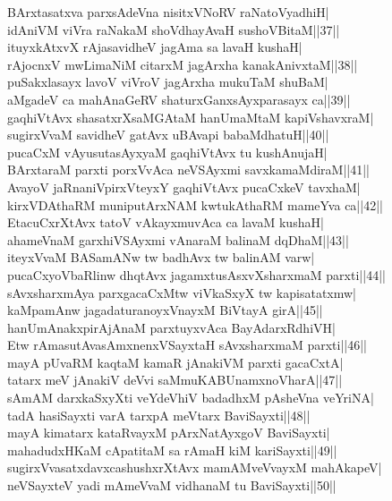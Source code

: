 \documentclass{article}
\begin{document}
BArxtasatxva parxsAdeVna nisitxVNoRV raNatoVyadhiH|\\
idAniVM viVra raNakaM shoVdhayAvaH sushoVBitaM||37||\\
ituyxkAtxvX rAjasavidheV  jagAma sa lavaH kushaH|\\
rAjocnxV mwLimaNiM citarxM jagArxha kanakAnivxtaM||38||\\
puSakxlasayx lavoV viVroV jagArxha mukuTaM shuBaM|\\
aMgadeV ca mahAnaGeRV shaturxGanxsAyxparasayx ca||39||\\
gaqhiVtAvx shasatxrXsaMGAtaM hanUmaMtaM kapiVshavxraM|\\
sugirxVvaM savidheV gatAvx uBAvapi babaMdhatuH||40||\\
pucaCxM vAyusutasAyxyaM gaqhiVtAvx tu kushAnujaH|\\
BArxtaraM parxti porxVvAca neVSAyxmi savxkamaMdiraM||41||\\
AvayoV jaRnaniVpirxVteyxY gaqhiVtAvx pucaCxkeV tavxhaM|\\
kirxVDAthaRM muniputArxNAM kwtukAthaRM mameYva ca||42||\\
EtacuCxrXtAvx tatoV vAkayxmuvAca ca lavaM kushaH|\\
ahameVnaM garxhiVSAyxmi vAnaraM balinaM dqDhaM||43||\\
iteyxVvaM BASamANw tw badhAvx tw balinAM varw|\\
pucaCxyoVbaRlinw dhqtAvx jagamxtusAsxvXsharxmaM parxti||44||\\
sAvxsharxmAya parxgacaCxMtw viVkaSxyX tw kapisatatxmw|\\
kaMpamAnw jagadaturanoyxVnayxM BiVtayA girA||45||\\
hanUmAnakxpirAjAnaM parxtuyxvAca BayAdarxRdhiVH|\\
Etw rAmasutAvasAmxnenxVSayxtaH sAvxsharxmaM parxti||46||\\
mayA pUvaRM kaqtaM kamaR jAnakiVM parxti gacaCxtA|\\
tatarx meV jAnakiV deVvi saMmuKABUnamxnoVharA||47||\\
sAmAM darxkaSxyXti veYdeVhiV badadhxM pAsheVna veYriNA|\\
tadA hasiSayxti varA tarxpA meVtarx BaviSayxti||48||\\
mayA kimatarx kataRvayxM pArxNatAyxgoV BaviSayxti|\\
mahadudxHKaM cApatitaM sa rAmaH kiM kariSayxti||49||\\
sugirxVvasatxdavxcashushxrXtAvx mamAMveVvayxM mahAkapeV|\\
neVSayxteV yadi mAmeVvaM vidhanaM tu BaviSayxti||50||\\
\end{document}
